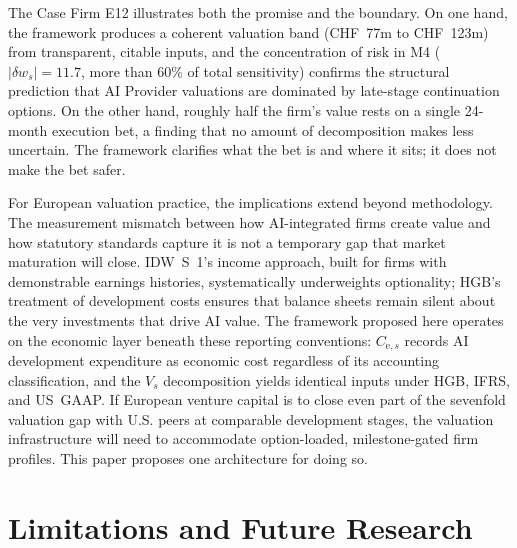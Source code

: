 \documentclass[oneside,10pt]{swissi}
\begin{document}
The Case Firm E12 illustrates both the promise and the boundary. On one hand, the framework produces a coherent valuation band (CHF~77m to CHF~123m) from transparent, citable inputs, and the concentration of risk in M4 ($|\delta w_s| = 11.7$, more than 60\% of total sensitivity) confirms the structural prediction that AI Provider valuations are dominated by late-stage continuation options. On the other hand, roughly half the firm's value rests on a single 24-month execution bet, a finding that no amount of decomposition makes less uncertain. The framework clarifies what the bet is and where it sits; it does not make the bet safer.

For European valuation practice, the implications extend beyond methodology. The measurement mismatch between how AI-integrated firms create value and how statutory standards capture it is not a temporary gap that market maturation will close. IDW~S~1's income approach, built for firms with demonstrable earnings histories, systematically underweights optionality; HGB's treatment of development costs ensures that balance sheets remain silent about the very investments that drive AI value. The framework proposed here operates on the economic layer beneath these reporting conventions: $C_{\mathrm{e},s}$ records AI development expenditure as economic cost regardless of its accounting classification, and the $V_s$ decomposition yields identical inputs under HGB, IFRS, and US~GAAP. If European venture capital is to close even part of the sevenfold valuation gap with U.S. peers at comparable development stages, the valuation infrastructure will need to accommodate option-loaded, milestone-gated firm profiles. This paper proposes one architecture for doing so.

\section{Limitations and Future Research}
\end{document}
